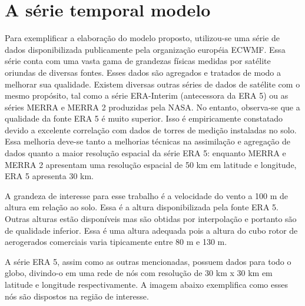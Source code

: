 \documentclass[
	12pt,				%
	openright,			%
	oneside,			%
	a4paper,			%
	english,			%
	french,				%
	spanish,			%
	brazil				%
	]{abntex2}
\begin{document}
\chapter{A série temporal modelo}

Para exemplificar a elaboração do modelo proposto, utilizou-se uma série de dados disponibilizada publicamente pela organização européia ECWMF. Essa série conta com uma vasta gama de grandezas físicas medidas por satélite oriundas de diversas fontes. Esses dados são agregados e tratados de modo a melhorar sua qualidade. Existem diversas outras séries de dados de satélite com o mesmo propósito, tal como a série ERA-Interim (antecessora da ERA 5) ou as séries MERRA e MERRA 2 produzidas pela NASA. No entanto, observa-se que a qualidade da fonte ERA 5 é muito superior. Isso é empiricamente constatado devido a excelente correlação com dados de torres de medição instaladas no solo. Essa melhoria deve-se tanto a melhorias técnicas na assimilação e agregação de dados quanto a maior resolução espacial da série ERA 5: enquanto MERRA e MERRA 2 apresentam uma resolução espacial de 50 km em latitude e longitude, ERA 5 apresenta 30 km. 

A grandeza de interesse para esse trabalho é a velocidade do vento a 100 m de altura em relação ao solo. Essa é a altura disponibilizada pela fonte ERA 5. Outras alturas estão disponíveis mas são obtidas por interpolação e portanto são de qualidade inferior. Essa é uma altura adequada pois a altura do cubo rotor de aerogerados comerciais varia tipicamente entre 80 m e 130 m. 


A série ERA 5, assim como as outras mencionadas, possuem dados para todo o globo, divindo-o em uma rede de nós com resolução de 30 km x 30 km em latitude e longitude respectivamente. A imagem abaixo exemplifica como esses nós são dispostos na região de interesse. 

\end{document}
